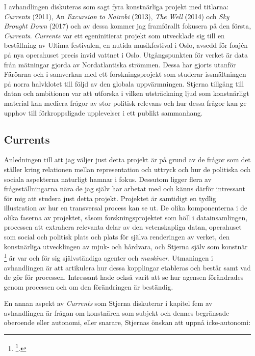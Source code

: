 \documentclass[11pt]{article}
\begin{document}
I avhandlingen diskuteras som sagt fyra konstnärliga projekt med
titlarna: \emph{Currents} (2011), An \emph{Excursion to Nairobi} (2013), \emph{The
Well} (2014) och \emph{Sky Brought Down} (2017) och av dessa kommer jag
framförallt fokusera på den första, \emph{Currents}. \emph{Currents} var ett
egeninitierat projekt som utvecklade sig till en beställning av
Ultima-festivalen, en nutida musikfestival i Oslo, avsedd för foajén på
nya operahuset precis invid vattnet i Oslo. Utgångspunkten för verket är
data från mätningar gjorda av Nordatlantiska strömmen. Dessa har gjorts
utanför Färöarna och i samverkan med ett forskningsprojekt som studerar
issmältningen på norra halvklotet till följd av den globala
uppvärmningen. Stjerna tillgång till datan och ambitionen var att
utforska i vilken utsträckning ljud som konstnärligt material kan
mediera frågor av stor politisk relevans och hur dessa frågor kan ge
upphov till förkroppsligade upplevelser i ett publikt sammanhang.

\subsection{Currents}
\label{sec:orge891943}
Anledningen till att jag väljer just detta projekt är på grund av de
frågor som det ställer kring relationen mellan representation och
uttryck och hur de politiska och sociala aspekterna naturligt hamnar i
fokus. Dessutom ligger flera av frågeställningarna nära de jag själv har
arbetat med och känns därför intressant för mig att studera just detta
projekt. Projektet är samtidigt en tydlig illustration av hur en
transversal process kan se ut. De olika komponenterna i de olika faserna
av projektet, såsom forskningsprojektet som höll i datainsamlingen,
processen att extrahera relevanta delar av den vetenskapliga datan,
operahuset som social och politisk plats och plats för själva
renderingen av verket, den konstnärliga utvecklingen av mjuk- och
hårdvara, och Stjerna själv som konstnär \footnote{\footcite[s.133]{Stjerna2018}.} är var och för sig
självständiga agenter och \emph{maskiner}. Utmaningen i avhandlingen är att
artikulera hur dessa kopplingar etableras och består samt vad de gör för
processen. Intressant hade också varit att se hur agensen förändrades
genom processen och om den förändringen är beständig.

En annan aspekt av \emph{Currents} som Stjerna diskuterar i kapitel fem av
avhandlingen är frågan om konstnären som subjekt och dennes begränsade
oberoende eller autonomi, eller snarare, Stjernas önskan att uppnå
icke-autonomi:
\end{document}
